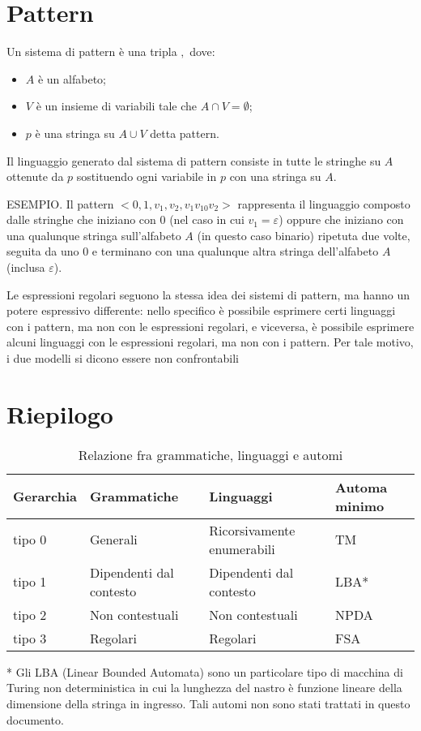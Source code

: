   \section{Pattern}

  \begin{definition}
    Un sistema di pattern è una tripla \(<A, V, p>,\) dove:
    \begin{itemize}
      \item \(A\) è un alfabeto;
      \item \(V\) è un insieme di variabili tale che \(A\cap V=\emptyset\);
      \item \(p\) è una stringa su \(A\cup V\) detta pattern.
    \end{itemize}
  \end{definition}

  \noindent
  Il linguaggio generato dal sistema di pattern consiste in tutte le stringhe su \(A\) ottenute da \(p\) sostituendo ogni variabile in \(p\) con una stringa su \(A\). 

  ESEMPIO. Il pattern \(<{0,1}, {v_1, v_2}, v_1v_10v_2>\) rappresenta il linguaggio composto dalle stringhe che iniziano con 0 (nel caso in cui \(v_1 = \varepsilon\)) oppure che iniziano con una qualunque stringa sull'alfabeto \(A\) (in questo caso binario) ripetuta due volte, seguita da uno 0 e terminano con una qualunque altra stringa dell'alfabeto \(A\) (inclusa \(\varepsilon\)).

  Le espressioni regolari seguono la stessa idea dei sistemi di pattern, ma hanno un potere espressivo differente: nello specifico è possibile esprimere certi linguaggi con i pattern, ma non con le espressioni regolari, e viceversa, è possibile esprimere alcuni linguaggi con le espressioni regolari, ma non con i pattern. Per tale motivo, i due modelli si dicono essere non confrontabili

  \section{Riepilogo}

  \begin{table}[ht]
    \caption{Relazione fra grammatiche, linguaggi e automi}
    \centering
    \vspace{10px}
    \begin{tabular}{l | l l l}
      Gerarchia & Grammatiche & Linguaggi & Automa minimo \\ 
      \hline
      tipo 0 & Generali & Ricorsivamente enumerabili & TM\\
      tipo 1 & Dipendenti dal contesto & Dipendenti dal contesto & LBA*\\
      tipo 2 & Non contestuali & Non contestuali & NPDA\\
      tipo 3 & Regolari & Regolari & FSA\\
    \end{tabular}
  \end{table}

  * Gli LBA (Linear Bounded Automata) sono un particolare tipo di macchina di Turing non deterministica in cui la lunghezza del nastro è funzione lineare della dimensione della stringa in ingresso. Tali automi non sono stati trattati in questo documento. 